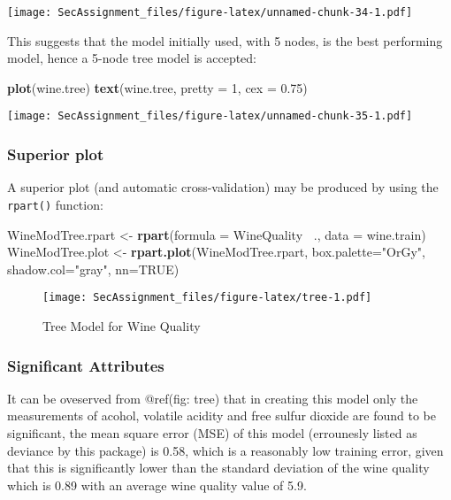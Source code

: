 \documentclass[12pt]{article}
\newenvironment{Shaded}{\begin{snugshade}}{\end{snugshade}}
\newcommand{\DataTypeTok}[1]{\textcolor[rgb]{0.13,0.29,0.53}{#1}}
\newcommand{\DecValTok}[1]{\textcolor[rgb]{0.00,0.00,0.81}{#1}}
\newcommand{\FloatTok}[1]{\textcolor[rgb]{0.00,0.00,0.81}{#1}}
\newcommand{\KeywordTok}[1]{\textcolor[rgb]{0.13,0.29,0.53}{\textbf{#1}}}
\newcommand{\NormalTok}[1]{#1}
\newcommand{\OperatorTok}[1]{\textcolor[rgb]{0.81,0.36,0.00}{\textbf{#1}}}
\newcommand{\OtherTok}[1]{\textcolor[rgb]{0.56,0.35,0.01}{#1}}
\newcommand{\StringTok}[1]{\textcolor[rgb]{0.31,0.60,0.02}{#1}}
\begin{document}
\texttt{[image: SecAssignment\_files/figure-latex/unnamed-chunk-34-1.pdf]}

This suggests that the model initially used, with 5 nodes, is the best
performing model, hence a 5-node tree model is accepted:

\begin{Shaded}
\begin{Highlighting}[]
\KeywordTok{plot}\NormalTok{(wine.tree)}
\KeywordTok{text}\NormalTok{(wine.tree, }\DataTypeTok{pretty =} \DecValTok{1}\NormalTok{, }\DataTypeTok{cex =} \FloatTok{0.75}\NormalTok{)}
\end{Highlighting}
\end{Shaded}

\texttt{[image: SecAssignment\_files/figure-latex/unnamed-chunk-35-1.pdf]}

\hypertarget{superior-plot}{%
\subsubsection{Superior plot}\label{superior-plot}}

A superior plot (and automatic cross-validation) may be produced by
using the \texttt{rpart()} function:

\begin{Shaded}
\begin{Highlighting}[]
\NormalTok{WineModTree.rpart <-}\StringTok{ }\KeywordTok{rpart}\NormalTok{(}\DataTypeTok{formula =}\NormalTok{ WineQuality}\OperatorTok{~}\StringTok{ }\NormalTok{., }\DataTypeTok{data =}\NormalTok{ wine.train)}
\NormalTok{WineModTree.plot  <-}\StringTok{ }\KeywordTok{rpart.plot}\NormalTok{(WineModTree.rpart, }\DataTypeTok{box.palette=}\StringTok{"OrGy"}\NormalTok{, }\DataTypeTok{shadow.col=}\StringTok{"gray"}\NormalTok{, }\DataTypeTok{nn=}\OtherTok{TRUE}\NormalTok{)}
\end{Highlighting}
\end{Shaded}

\begin{figure}
\centering
\texttt{[image: SecAssignment\_files/figure-latex/tree-1.pdf]}
\caption{Tree Model for Wine Quality}
\end{figure}

\hypertarget{significant-attributes}{%
\subsubsection{Significant Attributes}\label{significant-attributes}}

It can be oveserved from @ref(fig: tree) that in creating this model
only the measurements of acohol, volatile acidity and free sulfur
dioxide are found to be significant, the mean square error (MSE) of this
model (errounesly listed as deviance by this package) is 0.58, which is
a reasonably low training error, given that this is significantly lower
than the standard deviation of the wine quality which is 0.89 with an
average wine quality value of 5.9.
\end{document}
